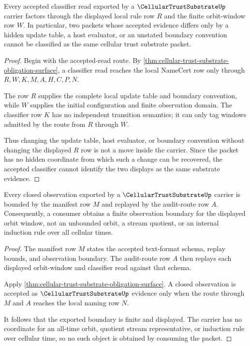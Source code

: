 \begin{theorem}
\label{thm:cellular-trust-substrate-local-rule-nonescape}
Every accepted classifier read exported by a $\CellularTrustSubstrateUp$ carrier factors through the displayed local rule row $R$ and the finite orbit-window row $W$. In particular, two packets whose accepted evidence differs only by a hidden update table, a host evaluator, or an unstated boundary convention cannot be classified as the same cellular trust substrate packet.
\end{theorem}
\begin{proof}
Begin with the accepted-read route. By \autoref{thm:cellular-trust-substrate-obligation-surface}, a classifier read reaches the local NameCert row only through $R,W,K,M,A,H,C,P,N$.

The row $R$ supplies the complete local update table and boundary convention, while $W$ supplies the initial configuration and finite observation domain. The classifier row $K$ has no independent transition semantics; it can only tag windows admitted by the route from $R$ through $W$.

Thus changing the update table, host evaluator, or boundary convention without changing the displayed $R$ row is not a move inside the carrier. Since the packet has no hidden coordinate from which such a change can be recovered, the accepted classifier cannot identify the two displays as the same substrate evidence.
\end{proof}

\begin{theorem}
\label{thm:cellular-trust-substrate-orbit-observation-boundary}
Every closed observation exported by a $\CellularTrustSubstrateUp$ carrier is bounded by the manifest row $M$ and replayed by the audit-route row $A$. Consequently, a consumer obtains a finite observation boundary for the displayed orbit window, not an unbounded orbit, a stream quotient, or an internal induction rule over all cellular times.
\end{theorem}
\begin{proof}
The manifest row $M$ states the accepted text-format schema, replay bounds, and observation boundary. The audit-route row $A$ then replays each displayed orbit-window and classifier read against that schema.

Apply \autoref{thm:cellular-trust-substrate-obligation-surface}. A closed observation is accepted as $\CellularTrustSubstrateUp$ evidence only when the route through $M$ and $A$ reaches the local naming row $N$.

It follows that the exported boundary is finite and displayed. The carrier has no coordinate for an all-time orbit, quotient stream representative, or induction rule over cellular time, so no such object is obtained by consuming the packet.
\end{proof}


